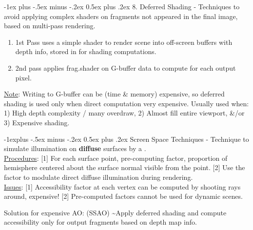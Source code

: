 \documentclass[10pt,landscape,letterpaper]{article}
\makeatletter
\renewcommand{\section}{\@startsection{section}{1}{0mm}%
                                {-1ex plus -.5ex minus -.2ex}%
                                {0.5ex plus .2ex}%
                                {\sffamily\large}}
\renewcommand{\subsection}{\@startsection{subsection}{2}{0mm}%
                                {-1explus -.5ex minus -.2ex}%
                                {0.5ex plus .2ex}%
                                {\sffamily\normalsize\itshape}}
\makeatother
\begin{document}
\begin{multicols}{3}
\section{8. Deferred Shading}
 - Techniques to avoid applying complex shaders on fragments not appeared in the final image, based on multi-pass rendering.
\begin{enumerate}
    \item 1st Pass uses a simple shader to render scene into off-screen buffers with depth info, stored in  for shading computations.
    \item 2nd pass applies frag.shader on G-buffer data to compute for each output pixel.
\end{enumerate}
\underline{Note}: Writing to G-buffer can be (time \& memory) expensive, so deferred shading is used only when direct computation very expensive. Usually used when: 1) High depth complexity / many overdraw, 2) Almost fill entire viewport, \&/or 3) Expensive shading.


\subsection{Screen Space Techniques}
 - Technique to simulate illumination on \textbf{diffuse} surfaces by a .
\\
\underline{Procedures}: [1] For each surface point, pre-computing  factor, proportion of hemisphere centered about the surface normal visible from the point. [2] Use the factor to modulate direct diffuse illumination during rendering.
\\
\underline{Issues}: [1] Accessibility factor at each vertex can be computed by shooting rays around, expensive! [2] Pre-computed factors cannot be used for dynamic scenes.

\smallskip

Solution for expensive AO:  (SSAO) \textasciitilde Apply deferred shading and compute accessibility only for output fragments based on depth map info.







\end{multicols}
\end{document}
